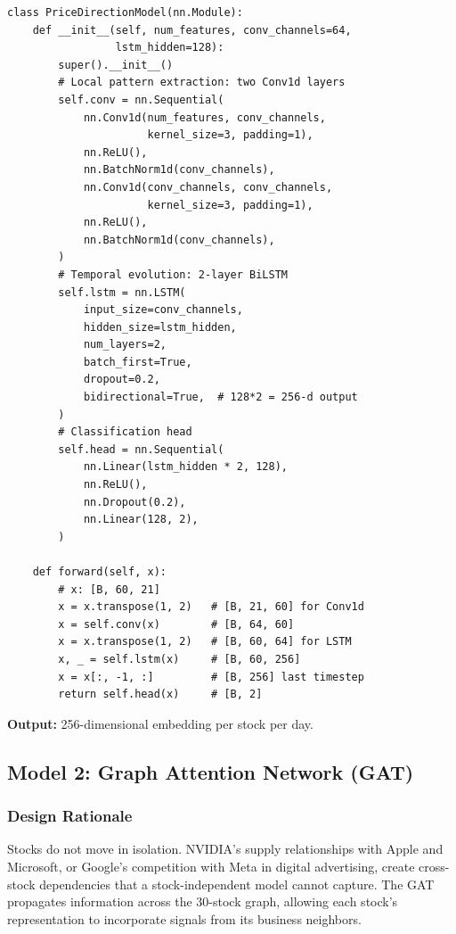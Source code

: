 \begin{lstlisting}[caption={CNN-BiLSTM price encoder (src/models/price\_model.py)}]
class PriceDirectionModel(nn.Module):
    def __init__(self, num_features, conv_channels=64,
                 lstm_hidden=128):
        super().__init__()
        # Local pattern extraction: two Conv1d layers
        self.conv = nn.Sequential(
            nn.Conv1d(num_features, conv_channels,
                      kernel_size=3, padding=1),
            nn.ReLU(),
            nn.BatchNorm1d(conv_channels),
            nn.Conv1d(conv_channels, conv_channels,
                      kernel_size=3, padding=1),
            nn.ReLU(),
            nn.BatchNorm1d(conv_channels),
        )
        # Temporal evolution: 2-layer BiLSTM
        self.lstm = nn.LSTM(
            input_size=conv_channels,
            hidden_size=lstm_hidden,
            num_layers=2,
            batch_first=True,
            dropout=0.2,
            bidirectional=True,  # 128*2 = 256-d output
        )
        # Classification head
        self.head = nn.Sequential(
            nn.Linear(lstm_hidden * 2, 128),
            nn.ReLU(),
            nn.Dropout(0.2),
            nn.Linear(128, 2),
        )

    def forward(self, x):
        # x: [B, 60, 21]
        x = x.transpose(1, 2)   # [B, 21, 60] for Conv1d
        x = self.conv(x)        # [B, 64, 60]
        x = x.transpose(1, 2)   # [B, 60, 64] for LSTM
        x, _ = self.lstm(x)     # [B, 60, 256]
        x = x[:, -1, :]         # [B, 256] last timestep
        return self.head(x)     # [B, 2]
\end{lstlisting}

\textbf{Output:} 256-dimensional embedding per stock per day.

\subsection{Model 2: Graph Attention Network (GAT)}

\subsubsection{Design Rationale}

Stocks do not move in isolation. NVIDIA's supply relationships with Apple and Microsoft, or Google's competition with Meta in digital advertising, create cross-stock dependencies that a stock-independent model cannot capture. The GAT propagates information across the 30-stock graph, allowing each stock's representation to incorporate signals from its business neighbors.

